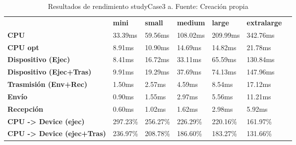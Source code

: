 \begin{table}[H]
    \centering
    \begin{tabular}{lllllll}
    \rowcolor[HTML]{DAE8FC} \ &  \textbf{mini} &  \textbf{small} &  \textbf{medium} &  \textbf{	large} &  \textbf{	extralarge} \\
    \cellcolor[HTML]{DAE8FC} \textbf{CPU} & 33.39ms & 59.56ms & 108.02ms & 	209.99ms & 	342.76ms \\
    \rowcolor[HTML]{EFEFEF} \cellcolor[HTML]{DAE8FC} \textbf{CPU opt} & 8.91ms & 10.90ms & 14.69ms & 	14.82ms & 	21.78ms \\
    \cellcolor[HTML]{DAE8FC} \textbf{Dispositivo (Ejec)} & 8.41ms & 16.72ms & 33.11ms & 	65.59ms & 	130.84ms \\
    \rowcolor[HTML]{EFEFEF} \cellcolor[HTML]{DAE8FC} \textbf{Dispositivo (Ejec+Tras)} & 9.91ms & 19.29ms & 37.69ms & 	74.13ms & 	147.96ms \\
    \cellcolor[HTML]{DAE8FC} \textbf{Trasmisión (Env+Rec)} & 1.50ms & 2.57ms & 4.59ms & 	8.54ms & 	17.12ms \\
    \rowcolor[HTML]{EFEFEF} \cellcolor[HTML]{DAE8FC} \textbf{Envío} & 0.90ms & 1.55ms & 2.97ms & 	5.56ms & 	11.21ms \\
    \cellcolor[HTML]{DAE8FC} \textbf{Recepción} & 0.60ms & 1.02ms & 1.62ms & 	2.98ms & 	5.92ms \\
    \rowcolor[HTML]{EFEFEF} \cellcolor[HTML]{DAE8FC} \textbf{CPU -> Device (ejec)} & 297.23\% & 256.27\% & 226.29\% & 	220.16\% & 	161.97\% \\
    \cellcolor[HTML]{DAE8FC} \textbf{CPU -> Device (ejec+Tras)} & 236.97\% & 208.78\% & 186.60\% & 	183.27\% & 	131.66\% \\
    \end{tabular}
    \caption[Resultados de rendimiento studyCase3 a]{{Resultados de rendimiento studyCase3 a. Fuente: Creación propia}}
    \label{table_test_studyCase3_a_hw_performanceResults}
\end{table}